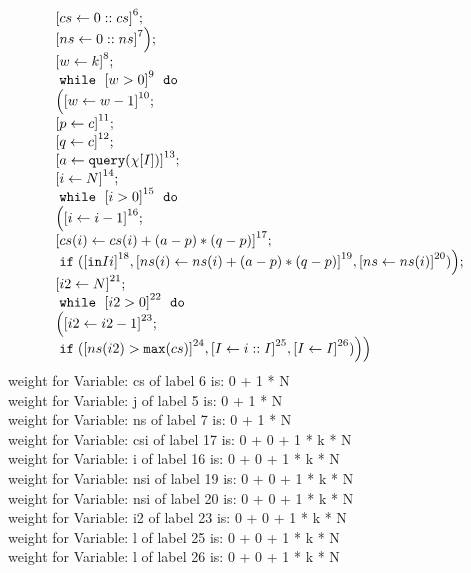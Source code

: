 \begin{example}
\[\begin{array}{l}
     \clabel{\assign{cs}{0::cs}}^6; \\
     \clabel{\assign{ns}{0::ns}}^7
     \Big); \\
     \clabel{\assign{w}{k}}^{8} ;\\
     \ewhile ~ \clabel{w > 0}^{9} ~ \edo ~ \\
    \Big(
    \clabel{\assign{w}{w-1}}^{10} ;\\
    \left[p \leftarrow c \right]^{11}; \\
    \left[q \leftarrow c \right]^{12}; \\
    \left[ a \leftarrow \query (\chi[I]) \right]^{13};\\
    \clabel{\assign{i}{N}}^{14} ; \\
    \ewhile ~ \clabel{i > 0}^{15} ~ \edo ~ \\
    \Big(
    \clabel{\assign{i}{i-1}}^{16} ;\\
    \clabel{\assign{cs(i)}{cs(i) + (a - p) * (q - p)}}^{17}; \\
    \eif (\clabel{\kw{in} I i}^{18}, \clabel{\assign{ns(i)}{{ns(i) + (a - p) * (q - p)}}}^{19},
    \clabel{\assign{ns}{ns(i)}}^{20}    )
    \Big); \\
    \clabel{\assign{i2}{N}}^{21} ; \\
    \ewhile ~ \clabel{i2 > 0}^{22} ~ \edo ~ \\
    \Big(
    \clabel{\assign{i2}{i2-1}}^{23} ;\\
    \eif (\clabel{ns(i2) > \kw{max}(cs)}^{24}, 
    \clabel{\assign{I}{i::I}}^{25},
    \clabel{\assign{I}{I}}^{26})
    \Big)
    \Big) 
\end{array}
\]
weight for Variable: cs of label 6 is: 0 + 1 * N \\
weight for Variable: j of label 5 is: 0 + 1 * N \\
weight for Variable: ns of label 7 is: 0 + 1 * N \\
weight for Variable: csi of label 17 is: 0 + 0 + 1 * k * N \\
weight for Variable: i of label 16 is: 0 + 0 + 1 * k * N \\
weight for Variable: nsi of label 19 is: 0 + 0 + 1 * k * N \\
weight for Variable: nsi of label 20 is: 0 + 0 + 1 * k * N \\
weight for Variable: i2 of label 23 is: 0 + 0 + 1 * k * N \\
weight for Variable: l of label 25 is: 0 + 0 + 1 * k * N \\
weight for Variable: l of label 26 is: 0 + 0 + 1 * k * N \\

\end{example}
